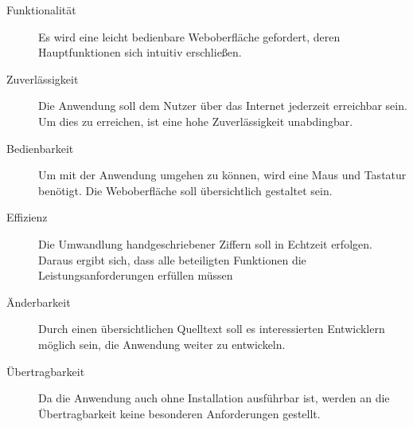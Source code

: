 \begin{description}
\item[Funktionalität]
Es wird eine leicht bedienbare Weboberfläche gefordert, deren Hauptfunktionen sich intuitiv erschließen.
\item[Zuverlässigkeit]
Die Anwendung soll dem Nutzer über das Internet jederzeit erreichbar sein. Um dies zu erreichen, ist eine hohe Zuverlässigkeit unabdingbar.
\item[Bedienbarkeit]
Um mit der Anwendung umgehen zu können, wird eine Maus und Tastatur benötigt. Die Weboberfläche soll übersichtlich gestaltet sein.
\item[Effizienz]
Die Umwandlung handgeschriebener Ziffern soll in Echtzeit erfolgen. Daraus ergibt sich, dass alle beteiligten Funktionen die Leistungsanforderungen erfüllen müssen
\item[Änderbarkeit]
Durch einen übersichtlichen Quelltext soll es interessierten Entwicklern möglich sein, die Anwendung weiter zu entwickeln.
\item[Übertragbarkeit]
Da die Anwendung auch ohne Installation ausführbar ist, werden an die Übertragbarkeit keine besonderen Anforderungen gestellt.
\end{description}

